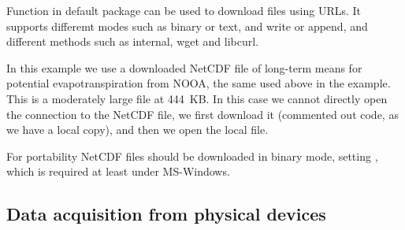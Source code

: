 \documentclass[krantz2]{krantz}\usepackage{knitr}%
\begin{document}
\begin{knitrout}\footnotesize
{}\color{fgcolor}\begin{kframe}
\begin{alltt}
 \hlkwb{<-}
    \hlstd{(} \hlstd{=} \hlstd{)}
\end{alltt}
\end{kframe}
\end{knitrout}

Function  in \Rlang default  package can be used to download files using URLs. It supports differemt modes such as binary or text, and write or append, and different methods such as internal, wget and libcurl.

In this example we use a downloaded NetCDF file of long-term means for potential evapotranspiration from NOOA, the same used above in the  example. This is a moderately large file at 444~KB. In this case we cannot directly open the connection to the NetCDF file, we first download it (commented out code, as we have a local copy), and then we open the local file.

\begin{knitrout}\footnotesize
{}\color{fgcolor}\begin{kframe}
\begin{alltt}
 \hlkwb{<-} \hlstd{(}\hlstd{,}
                \hlstd{,}
                 \hlstd{=} \hlstd{)}
 \hlkwb{<-} \hlstd{(}\hlstd{)}
\end{alltt}
\end{kframe}
\end{knitrout}

\begin{warningbox}
For portability NetCDF files should be downloaded in binary mode, setting , which is required at least under MS-Windows.
\end{warningbox}

\subsection{Data acquisition from physical devices}\label{sec:data:acquisition}
\end{document}
